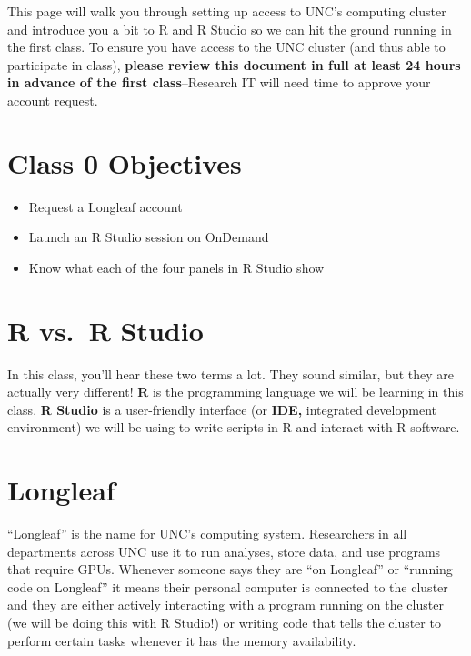 \documentclass[
  letterpaper,
  DIV=11,
  numbers=noendperiod]{scrreprt}
\begin{document}
This page will walk you through setting up access to UNC's computing
cluster and introduce you a bit to R and R Studio so we can hit the
ground running in the first class. To ensure you have access to the UNC
cluster (and thus able to participate in class), \textbf{please review
this document in full at least 24 hours in advance of the first
class}--Research IT will need time to approve your account request.

\hypertarget{class-0-objectives}{%
\section{Class 0 Objectives}\label{class-0-objectives}}

\begin{itemize}
\item
  Request a Longleaf account
\item
  Launch an R Studio session on OnDemand
\item
  Know what each of the four panels in R Studio show
\end{itemize}

\hypertarget{r-vs.-r-studio}{%
\section{R vs.~R Studio}\label{r-vs.-r-studio}}

In this class, you'll hear these two terms a lot. They sound similar,
but they are actually very different! \textbf{R} is the programming
language we will be learning in this class. \textbf{R Studio} is a
user-friendly interface (or \textbf{IDE,} integrated development
environment) we will be using to write scripts in R and interact with R
software.

\hypertarget{longleaf}{%
\section{Longleaf}\label{longleaf}}

``Longleaf'' is the name for UNC's computing system. Researchers in all
departments across UNC use it to run analyses, store data, and use
programs that require GPUs. Whenever someone says they are ``on
Longleaf'' or ``running code on Longleaf'' it means their personal
computer is connected to the cluster and they are either actively
interacting with a program running on the cluster (we will be doing this
with R Studio!) or writing code that tells the cluster to perform
certain tasks whenever it has the memory availability.
\end{document}
